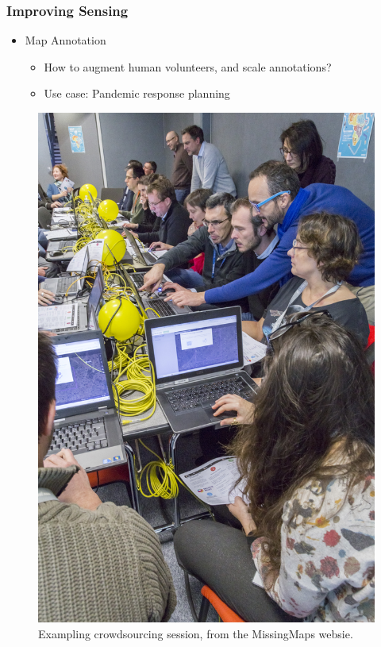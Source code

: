 \documentclass[10pt,mathserif]{beamer}
\begin{document}
\begin{frame}
  \frametitle{Improving Sensing}
  \begin{itemize}
  \item Map Annotation
    \begin{itemize}
    \item How to augment human volunteers, and scale annotations?
    \item Use case: Pandemic response planning
    \end{itemize}
  \end{itemize}
  \begin{figure}
    \centering
    \includegraphics[width=0.3\paperwidth]{figures/mapathon}
    \caption{Exampling crowdsourcing session, from the MissingMaps
      websie. \label{fig:label} }
  \end{figure}
\end{frame}
\end{document}

